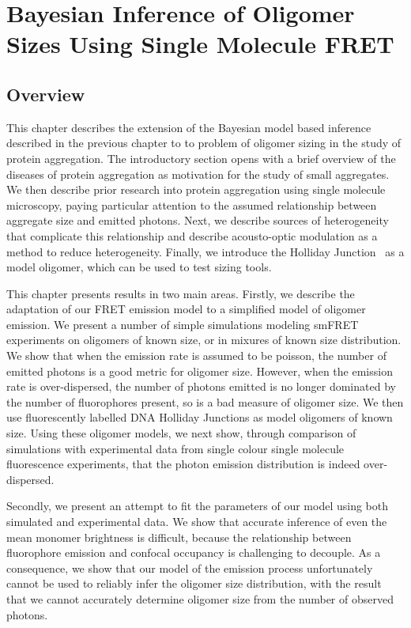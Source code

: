 \chapter{Bayesian Inference of Oligomer Sizes Using Single Molecule FRET}
\label{chap:sizing}

\section{Overview}
This chapter describes the extension of the Bayesian model based inference described in the previous chapter to to problem of oligomer sizing in the study of protein aggregation. The introductory section opens with a brief overview of the diseases of protein aggregation as motivation for the study of small aggregates. We then describe prior research into protein aggregation using single molecule microscopy, paying particular attention to the assumed relationship between aggregate size and emitted photons. Next, we describe sources of heterogeneity that complicate this relationship and describe acousto-optic modulation as a method to reduce heterogeneity. Finally, we introduce the Holliday Junction~\cite{holliday1964} as a model oligomer, which can be used to test sizing tools.

This chapter presents results in two main areas. Firstly, we describe the adaptation of our FRET emission model to a simplified model of oligomer emission. We present a number of simple simulations modeling smFRET experiments on oligomers of known size, or in mixures of known size distribution. We show that when the emission rate is assumed to be poisson, the number of emitted photons is a good metric for oligomer size. However, when the emission rate is over-dispersed, the number of photons emitted is no longer dominated by the number of fluorophores present, so is a bad measure of oligomer size. We then use fluorescently labelled DNA Holliday Junctions as model oligomers of known size. Using these oligomer models, we next show, through comparison of simulations with experimental data from single colour single molecule fluorescence experiments, that the photon emission distribution is indeed over-dispersed. 

Secondly, we present an attempt to fit the parameters of our model using both simulated and experimental data. We show that accurate inference of even the mean monomer brightness is difficult, because the relationship between fluorophore emission and confocal occupancy is challenging to decouple. As a consequence, we show that our model of the emission process unfortunately cannot be used to reliably infer the oligomer size distribution, with the result that we cannot accurately determine oligomer size from the number of observed photons.

